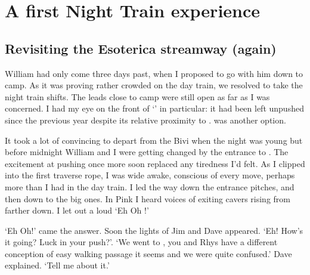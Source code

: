 \section{A first Night Train experience}
\begin{marginfigure}
\end{marginfigure}

\subsection{Revisiting the Esoterica streamway (again)}
William had only come three days past, when I proposed to go with him down to camp. As it was proving rather crowded on the day train, we resolved to take the night train shifts. The leads close to camp were still open as far as I was concerned. I had my eye on the front of `' in particular: it had been left unpushed since the previous year despite its relative proximity to .  was another option.

It took a lot of convincing to depart from the Bivi when the night was young but before midnight William and I were getting changed by the entrance to . The excitement at pushing once more soon replaced any tiredness I'd felt. As I clipped into the first traverse rope, I was wide awake, conscious of every move, perhaps more than I had in the day train. I led the way down the entrance pitches, and then down to the big ones. In Pink I heard voices of exiting cavers rising from farther down. I let out a loud `Eh Oh !'

 `Eh Oh!' came the answer. Soon the lights of Jim and Dave appeared. `Eh! How's it going? Luck in your push?'.
`We went to , you and Rhys have a different conception of easy walking passage it seems and we were quite confused.' Dave explained.
`Tell me about it.'

